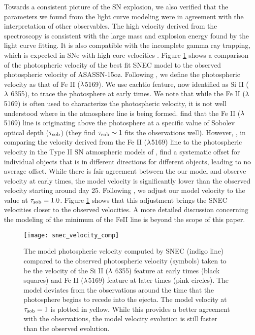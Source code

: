 \documentclass[a4paper,fleqn,usenatbib]{mnras}
\begin{document}
Towards a consistent picture of the SN explosion, we also verified that the parameters we found from the light curve modeling were in agreement with the interpretation of other observables.
The high velocity derived from the spectroscopy is consistent with the large mass and explosion energy found by the light curve fitting.
It is also compatible with the incomplete gamma ray trapping, which is expected in SNe with high core velocities \citep{2011jerkstrand}.
Figure \ref{fig:SNECVelocityCompare} shows a comparison of the photospheric velocity of the best fit SNEC model to the observed photospheric velocity of ASASSN-15oz.
Following \citet{2014faran}, we define the photospheric velocity as that of Fe II ($\rm{\lambda}$5169). 
We use cachtio feature, now identified as Si II ($\rm{\lambda}$ 6355), to trace the photosphere at early times.
We note that while the Fe II ($\rm{\lambda}$5169) is often used to characterize the photospheric velocity, it is not well understood where in the atmosphere line is being formed. 
\citet{2018paxton} find that the Fe II ($\rm{\lambda}$5169) line is originating above the photosphere at a specific value of Sobolev optical depth ($\rm{\tau_{sob}}$) (they find $\rm{\tau_{sob} \sim1}$ fits the observations well).
However, \citet{2001hamuy}, in comparing the velocity derived from the Fe II ($\rm{\lambda}$5169) line to the photospheric velocity in the Type II SN atmospheric models of \citet{1996eastman}, find a systematic offset for individual objects that is in different directions for different objects, leading to no average offset. 
While there is fair agreement between the our model and observe velocity at early times, the model velocity is significantly lower than the observed velocity starting around day 25.
Following \citet{2018paxton}, we adjust our model velocity to the value at $\rm{\tau_{sob} = 1.0}$. 
Figure \ref{fig:SNECVelocityCompare} shows that this adjustment brings the SNEC velocities closer to the observed velocities.
A more detailed discussion concerning the modeling of the minimum of the FeII line is beyond the scope of this paper.
\begin{figure}
\begin{center}
\texttt{[image: snec\_velocity\_comp]} %
\caption{The model photospheric velocity computed by SNEC (indigo line) compared to the observed photospheric velocity (symbols) taken to be the velocity of the Si II ($\rm{\lambda}$ 6355) feature at early times (black squares) and Fe II ($\rm{\lambda}$5169) feature at later times (pink circles). 
The model deviates from the observations around the time that the photosphere begins to recede into the ejecta.
The model velocity at $\rm{\tau_{sob}=1}$ is plotted in yellow. 
While this provides a better agreement with the observations, the model velocity evolution is still faster than the observed evolution.
}
\label{fig:SNECVelocityCompare}
\end{center}
\end{figure}
\end{document}
